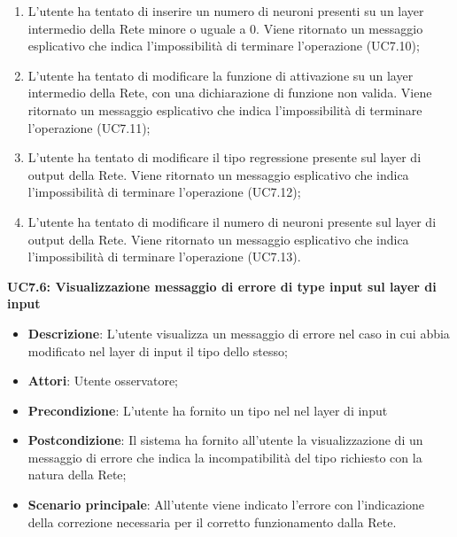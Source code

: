 \begin{itemize}
\begin{enumerate}
\item L'utente ha tentato di inserire un numero di neuroni presenti su un layer intermedio della Rete minore o uguale a 0. Viene ritornato un messaggio esplicativo che indica l'impossibilit\`a di terminare l'operazione (UC7.10);
\item L'utente ha tentato di modificare la funzione di attivazione su un layer intermedio della Rete, con una dichiarazione di funzione non valida. Viene ritornato un messaggio esplicativo che indica l'impossibilit\`a di terminare l'operazione (UC7.11);
\item L'utente ha tentato di modificare il tipo regressione presente sul layer di output della Rete. Viene ritornato un messaggio esplicativo che indica l'impossibilit\`a di terminare l'operazione (UC7.12);
\item L'utente ha tentato di modificare il numero di neuroni presente sul layer di output della Rete. Viene ritornato un messaggio esplicativo che indica l'impossibilit\`a di terminare l'operazione (UC7.13).
\end{enumerate}
\end{itemize}

\textbf{UC7.6: Visualizzazione messaggio di errore di type input sul layer di input}\mbox{}
\label{UC7.6: Visualizzazione messaggio di errore di type input sul layer di input}
\noindent
\begin{itemize}
\item \textbf{Descrizione}: L'utente visualizza un messaggio di errore nel caso in cui abbia modificato nel layer di input il tipo dello stesso;
\item \textbf{Attori}: Utente osservatore;
\item \textbf{Precondizione}: L'utente ha fornito un tipo nel nel layer di input
\item \textbf{Postcondizione}: Il sistema ha fornito all'utente la visualizzazione di un messaggio di errore che indica la incompatibilit\`a del tipo richiesto con la natura della Rete;
\item \textbf{Scenario principale}: All'utente viene indicato l'errore con l'indicazione della correzione necessaria per il corretto funzionamento dalla Rete.
\end{itemize}

